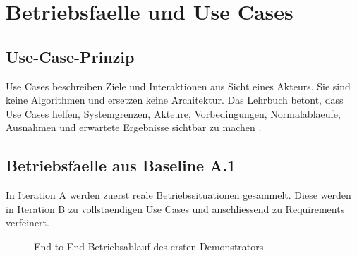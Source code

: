 \chapter{Betriebsfaelle und Use Cases}

\section{Use-Case-Prinzip}

Use Cases beschreiben Ziele und Interaktionen aus Sicht eines Akteurs. Sie sind keine Algorithmen und ersetzen keine Architektur. Das Lehrbuch betont, dass Use Cases helfen, Systemgrenzen, Akteure, Vorbedingungen, Normalablaeufe, Ausnahmen und erwartete Ergebnisse sichtbar zu machen \cite[Kap.~7]{becker2026sysml}.

\section{Betriebsfaelle aus Baseline A.1}

In Iteration A werden zuerst reale Betriebssituationen gesammelt. Diese werden in Iteration B zu vollstaendigen Use Cases und anschliessend zu Requirements verfeinert.

\begin{figure}[htbp]
  \centering
  \resizebox{\textwidth}{!}{}
  \caption{End-to-End-Betriebsablauf des ersten Demonstrators}
  \label{fig:operating-cases}
\end{figure}

